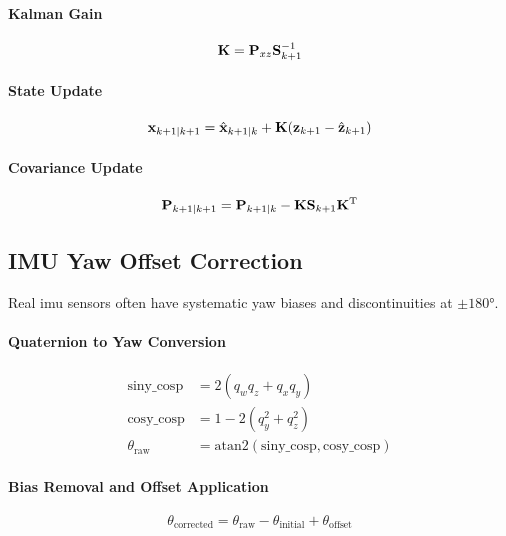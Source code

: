 \paragraph{Kalman Gain}
\begin{equation}
\mathbf{K} = \mathbf{P}_{xz} \mathbf{S}_{k+1}^{-1}
\label{eq:kalman_gain}
\end{equation}

\paragraph{State Update}
\begin{equation}
\mathbf{x}_{k+1|k+1} = \hat{\mathbf{x}}_{k+1|k} + \mathbf{K} (\mathbf{z}_{k+1} - \hat{\mathbf{z}}_{k+1})
\label{eq:state_update}
\end{equation}

\paragraph{Covariance Update}
\begin{equation}
\mathbf{P}_{k+1|k+1} = \mathbf{P}_{k+1|k} - \mathbf{K} \mathbf{S}_{k+1} \mathbf{K}^\mathrm{T}
\label{eq:covariance_update}
\end{equation}

\subsection{IMU Yaw Offset Correction}

Real \acrshort{imu} sensors often have systematic yaw biases and discontinuities at $\pm 180°$.

\paragraph{Quaternion to Yaw Conversion}
\begin{equation}
\begin{aligned}
\text{siny\_cosp} &= 2(q_w q_z + q_x q_y) \\
\text{cosy\_cosp} &= 1 - 2(q_y^2 + q_z^2) \\
\theta_{\text{raw}} &= \text{atan2}(\text{siny\_cosp}, \text{cosy\_cosp})
\end{aligned}
\label{eq:quaternion_to_yaw}
\end{equation}

\paragraph{Bias Removal and Offset Application}
\begin{equation}
\theta_{\text{corrected}} = \theta_{\text{raw}} - \theta_{\text{initial}} + \theta_{\text{offset}}
\label{eq:yaw_correction}
\end{equation}

